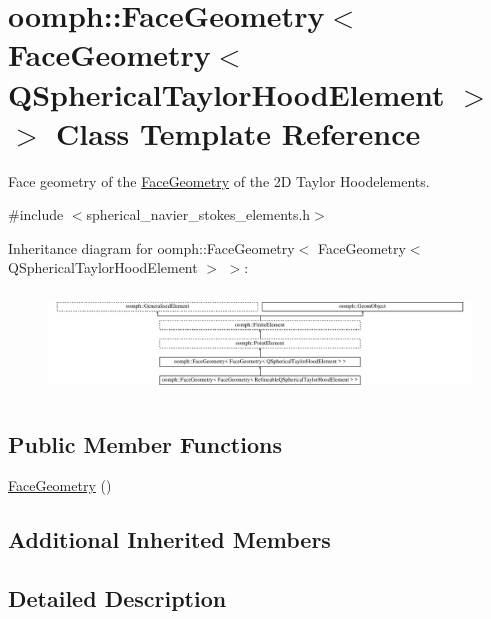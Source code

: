 \hypertarget{classoomph_1_1FaceGeometry_3_01FaceGeometry_3_01QSphericalTaylorHoodElement_01_4_01_4}{}\section{oomph\+:\+:Face\+Geometry$<$ Face\+Geometry$<$ Q\+Spherical\+Taylor\+Hood\+Element $>$ $>$ Class Template Reference}
\label{classoomph_1_1FaceGeometry_3_01FaceGeometry_3_01QSphericalTaylorHoodElement_01_4_01_4}


Face geometry of the \hyperlink{classoomph_1_1FaceGeometry}{Face\+Geometry} of the 2D Taylor Hoodelements.  




{\ttfamily \#include $<$spherical\+\_\+navier\+\_\+stokes\+\_\+elements.\+h$>$}

Inheritance diagram for oomph\+:\+:Face\+Geometry$<$ Face\+Geometry$<$ Q\+Spherical\+Taylor\+Hood\+Element $>$ $>$\+:\begin{figure}[H]
\begin{center}
\leavevmode
\includegraphics[height=2.739726cm]{classoomph_1_1FaceGeometry_3_01FaceGeometry_3_01QSphericalTaylorHoodElement_01_4_01_4}
\end{center}
\end{figure}
\subsection*{Public Member Functions}
\begin{DoxyCompactItemize}
\item 
\hyperlink{classoomph_1_1FaceGeometry_3_01FaceGeometry_3_01QSphericalTaylorHoodElement_01_4_01_4_ad84b078cb737437e098c8da13da598c5}{Face\+Geometry} ()
\end{DoxyCompactItemize}
\subsection*{Additional Inherited Members}


\subsection{Detailed Description}
